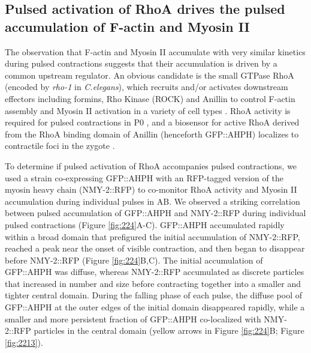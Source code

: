 \subsection{Pulsed activation of RhoA drives the pulsed accumulation of F-actin and Myosin II}
The observation that F-actin and Myosin II accumulate with very similar kinetics during pulsed contractions suggests that their accumulation is driven by a common upstream regulator. An obvious candidate is the small GTPase RhoA (encoded by \textit{rho-1} in \textit{C.elegans}), which recruits and/or activates downstream effectors including formins, Rho Kinase (ROCK) and Anillin to control F-actin assembly and Myosin II activation in a variety of cell types \cite{Jaffe:2005kq, Piekny:2008jf}. RhoA activity is required for pulsed contractions in P0 \cite{Motegi:2006hi, Schonegg:2007if, Tse:2012fp}, and a biosensor for active RhoA derived from the RhoA binding domain of Anillin (henceforth GFP::AHPH) localizes to contractile foci in the zygote \cite{Tse:2011gd}. 

To determine if pulsed activation of RhoA accompanies pulsed contractions, we used a strain co-expressing GFP::AHPH \cite{Tse:2012fp} with an RFP-tagged version of the myosin heavy chain (NMY-2::RFP) to co-monitor RhoA activity and Myosin II accumulation during individual pulses in AB.  We observed a striking correlation between pulsed accumulation of GFP::AHPH and NMY-2::RFP during individual pulsed contractions (Figure \ref{fig:224}A-C).  GFP::AHPH accumulated rapidly within a broad domain that prefigured the initial accumulation of NMY-2::RFP, reached a peak near the onset of visible contraction, and then began to disappear before NMY-2::RFP (Figure \ref{fig:224}B,C). The initial accumulation of GFP::AHPH was diffuse, whereas NMY-2::RFP accumulated as discrete particles that increased in number and size before contracting together into a smaller and tighter central domain. During the falling phase of each pulse, the diffuse pool of GFP::AHPH at the outer edges of the initial domain disappeared rapidly, while a smaller and more persistent fraction of GFP::AHPH co-localized with NMY-2::RFP particles in the central domain (yellow arrows in Figure \ref{fig:224}B; Figure \ref{fig:2213}).


